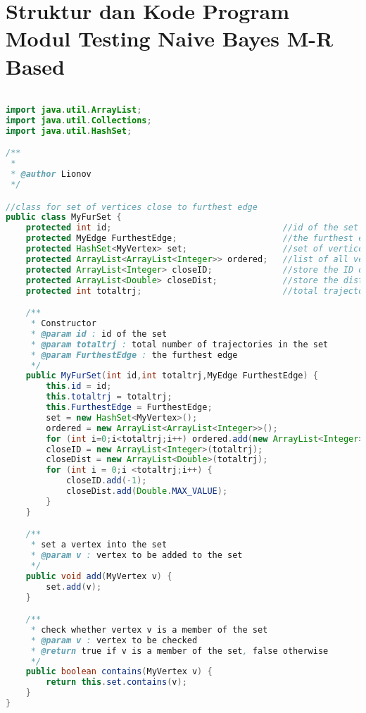 \chapter{Struktur dan Kode Program Modul Testing Naive Bayes M-R Based}
\label{lamp:B}

\singlespacing 
%
%
\begin{lstlisting}[language=Java,basicstyle=\tiny,caption=MyFurSet.java]

import java.util.ArrayList;
import java.util.Collections;
import java.util.HashSet; 

/**
 *
 * @author Lionov
 */

//class for set of vertices close to furthest edge
public class MyFurSet {
    protected int id;                                  //id of the set
    protected MyEdge FurthestEdge;                     //the furthest edge
    protected HashSet<MyVertex> set;                   //set of vertices close to furthest edge
    protected ArrayList<ArrayList<Integer>> ordered;   //list of all vertices in the set for each trajectory
    protected ArrayList<Integer> closeID;              //store the ID of all vertices
    protected ArrayList<Double> closeDist;             //store the distance of all vertices
    protected int totaltrj;                            //total trajectories in the set

    /**
     * Constructor
     * @param id : id of the set
     * @param totaltrj : total number of trajectories in the set
     * @param FurthestEdge : the furthest edge
     */
    public MyFurSet(int id,int totaltrj,MyEdge FurthestEdge) {
        this.id = id;
        this.totaltrj = totaltrj;
        this.FurthestEdge = FurthestEdge;
        set = new HashSet<MyVertex>();
        ordered = new ArrayList<ArrayList<Integer>>();
        for (int i=0;i<totaltrj;i++) ordered.add(new ArrayList<Integer>());
        closeID = new ArrayList<Integer>(totaltrj);
        closeDist = new ArrayList<Double>(totaltrj);
        for (int i = 0;i <totaltrj;i++) {
            closeID.add(-1);
            closeDist.add(Double.MAX_VALUE);
        }
    }

    /**
     * set a vertex into the set
     * @param v : vertex to be added to the set
     */
    public void add(MyVertex v) {
        set.add(v);
    }

    /**
     * check whether vertex v is a member of the set
     * @param v : vertex to be checked
     * @return true if v is a member of the set, false otherwise
     */
    public boolean contains(MyVertex v) {
        return this.set.contains(v);
    }
}
\end{lstlisting}
